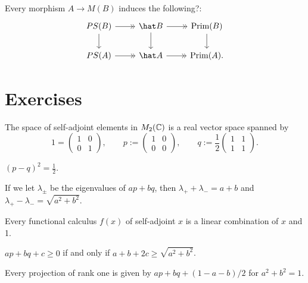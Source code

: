 \documentclass{../../large}
\newcommand{\Prim}{\operatorname{Prim}}
\begin{document}
Every morphism $A\to M(B)$ induces the following?:
\[\begin{tikzcd}
PS(B) \rar[->>]\dar & \hat B \rar[->>]\dar & \Prim(B) \dar \\
PS(A) \rar[->>] & \hat A \rar[->>] & \Prim(A).
\end{tikzcd}\]





\section*{Exercises}




\begin{prb}[Projections in $M_2(\C)$]
The space of self-adjoint elements in $M_2(\C)$ is a real vector space spanned by
\[1=\begin{pmatrix}1&0\\0&1\end{pmatrix},\qquad p:=\begin{pmatrix}1&0\\0&0\end{pmatrix},\qquad q:=\frac12\begin{pmatrix}1&1\\1&1\end{pmatrix}.\]
\begin{parts}
\item $(p-q)^2=\frac12$.
\item If we let $\lambda_\pm$ be the eigenvalues of $ap+bq$, then $\lambda_++\lambda_-=a+b$ and $\lambda_+-\lambda_-=\sqrt{a^2+b^2}$.
\item Every functional calculus $f(x)$ of self-adjoint $x$ is a linear combination of $x$ and 1.
\item $ap+bq+c\ge0$ if and only if $a+b+2c\ge\sqrt{a^2+b^2}$.
\item Every projection of rank one is given by $ap+bq+(1-a-b)/2$ for $a^2+b^2=1$.
\end{parts}
\end{prb}
\end{document}
